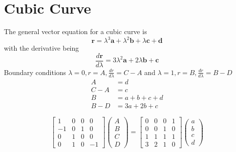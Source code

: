 \documentclass[a5paper,12pt]{article}
\begin{document}

\clearpage
\tableofcontents
\listoftables
\listoffigures
\clearpage

\section{Cubic Curve}
The general vector equation for a cubic curve is
\begin{equation}\label{eq:curve}
\mathbf{r}=\lambda^3\mathbf{a}+\lambda^2\mathbf{b}+\lambda\mathbf{c}+\mathbf{d}
\end{equation}
with the derivative being
\begin{equation}\label{eq:derivative_curve}
\frac{d\mathbf{r}}{d\lambda}=3\lambda^2\mathbf{a}+2\lambda\mathbf{b}+\mathbf{c}
\end{equation} 
Boundary conditions
$\lambda=0 , r = A , \frac{d r}{d\lambda}=C - A$ and $\lambda=1 , r = B , \frac{d r}{d\lambda}=B - D$
\begin{align}\label{eq:bc_equation}
A &= d \nonumber \\
C-A &= c \nonumber \\
B &= a + b + c + d \nonumber \\
B-D &= 3a + 2 b + c
\end{align}

\begin{equation}
\left[ \begin{matrix}
1 & 0 & 0 & 0 \\
-1 & 0 & 1 & 0 \\
0 & 1 & 0 & 0 \\
0 & 1 & 0 & -1 
\end{matrix} \right]
\left( \begin{matrix} A \\ B\\ C \\D\end{matrix}\right) = \left[ \begin{matrix}
0 & 0 & 0 & 1 \\
0 & 0 & 1 & 0 \\
1 & 1 & 1 & 1 \\
3 & 2 & 1 & 0 
\end{matrix} \right]
\left( \begin{matrix} a \\ b\\ c \\d\end{matrix}\right)
\end{equation}


\clearpage
{}
\printindex
\end{document}
